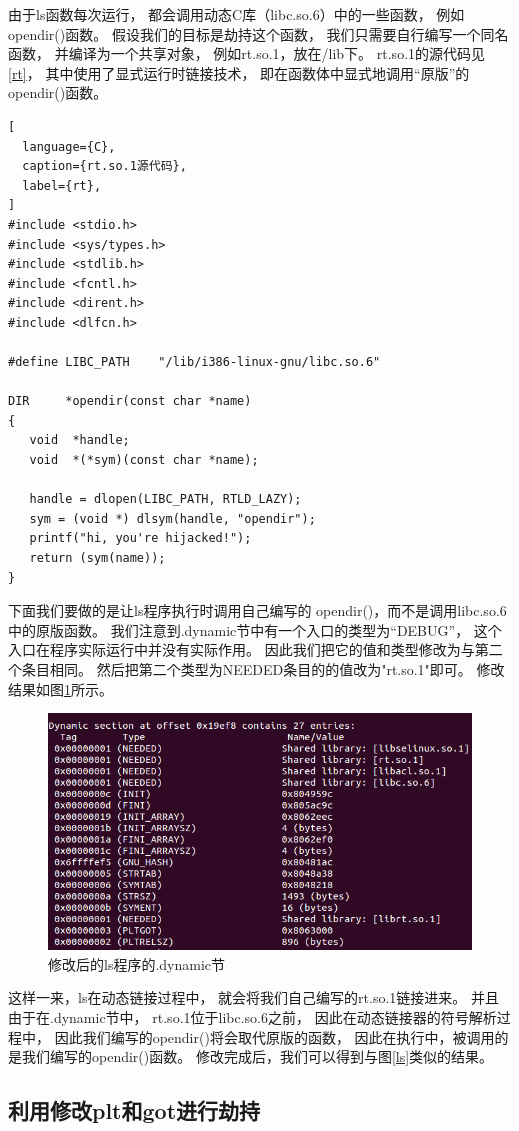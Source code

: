 由于ls函数每次运行，
都会调用动态C库（libc.so.6）中的一些函数，
例如opendir()函数。
假设我们的目标是劫持这个函数，
我们只需要自行编写一个同名函数，
并编译为一个共享对象，
例如rt.so.1，放在/lib下。
rt.so.1的源代码见\ref{rt}，
其中使用了显式运行时链接技术，
即在函数体中显式地调用“原版”的opendir()函数。

\begin{lstlisting}[
  language={C},
  caption={rt.so.1源代码},
  label={rt},
]
#include <stdio.h>
#include <sys/types.h>
#include <stdlib.h>
#include <fcntl.h>
#include <dirent.h>
#include <dlfcn.h>

#define LIBC_PATH    "/lib/i386-linux-gnu/libc.so.6"

DIR     *opendir(const char *name)
{
   void  *handle;
   void  *(*sym)(const char *name);

   handle = dlopen(LIBC_PATH, RTLD_LAZY);
   sym = (void *) dlsym(handle, "opendir");
   printf("hi, you're hijacked!"); 
   return (sym(name));
}
\end{lstlisting}

下面我们要做的是让ls程序执行时调用自己编写的
opendir()，而不是调用libc.so.6中的原版函数。
我们注意到.dynamic节中有一个入口的类型为“DEBUG”，
这个入口在程序实际运行中并没有实际作用。
因此我们把它的值和类型修改为与第二个条目相同。
然后把第二个类型为NEEDED条目的的值改为"rt.so.1"即可。
修改结果如图\ref{lsdyn2}所示。

\begin{figure}[h!]
    \centering
    \includegraphics[width=.6\textwidth]{figure/lsdyn2.png}
    \caption{修改后的ls程序的.dynamic节}
    \label{lsdyn2}
\end{figure}

这样一来，ls在动态链接过程中，
就会将我们自己编写的rt.so.1链接进来。
并且由于在.dynamic节中，
rt.so.1位于libc.so.6之前，
因此在动态链接器的符号解析过程中，
因此我们编写的opendir()将会取代原版的函数，
因此在执行中，被调用的是我们编写的opendir()函数。
修改完成后，我们可以得到与图\ref{ls}类似的结果。

\subsection{利用修改plt和got进行劫持}

